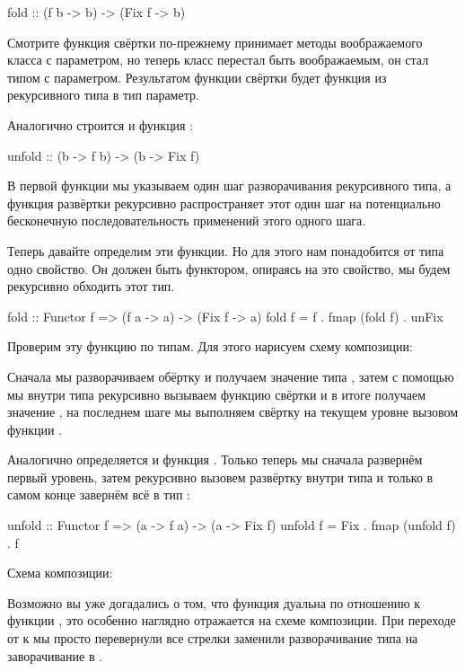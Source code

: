 \begin{code}
fold :: (f b -> b) -> (Fix f -> b)
\end{code}

Смотрите функция свёртки по-прежнему принимает методы
воображаемого класса с параметром, но теперь класс перестал
быть воображаемым, он стал типом с параметром. Результатом
функции свёртки будет функция из рекурсивного типа 
в тип параметр.

Аналогично строится и функция :

\begin{code}
unfold :: (b -> f b) -> (b -> Fix f)
\end{code}

В первой функции мы указываем один шаг разворачивания
рекурсивного типа, а функция развёртки рекурсивно 
распространяет этот один шаг на потенциально бесконечную 
последовательность применений этого одного шага.

Теперь давайте определим эти функции. Но для этого 
нам понадобится от типа  одно свойство. Он должен быть 
функтором, опираясь на это свойство, мы будем рекурсивно
обходить этот тип.

\begin{code}
fold :: Functor f => (f a -> a) -> (Fix f -> a)
fold f = f . fmap (fold f) . unFix
\end{code}

Проверим эту функцию по типам. Для этого 
нарисуем схему композиции:


Сначала мы разворачиваем обёртку  и получаем
значение типа , затем с помощью 
мы внутри типа  рекурсивно вызываем функцию свёртки
и в итоге получаем значение , на последнем шаге 
мы выполняем свёртку на текущем уровне вызовом функции .

Аналогично определяется и функция . 
Только теперь мы сначала развернём первый уровень,
затем рекурсивно вызовем развёртку внутри типа 
и только в самом конце завернём всё в тип :

\begin{code}
unfold :: Functor f => (a -> f a) -> (a -> Fix f)
unfold f = Fix . fmap (unfold f) . f
\end{code}

Схема композиции:


Возможно вы уже догадались о том, что функция 
дуальна по отношению к функции , это особенно
наглядно отражается на схеме композиции. При переходе от
 к  мы просто перевернули все стрелки
заменили разворачивание типа  на заворачивание 
в .

